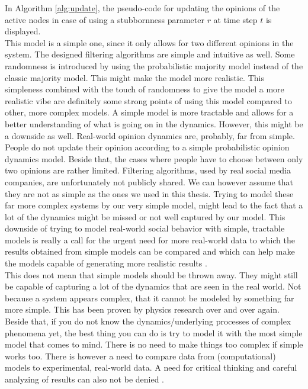 \documentclass[11 pt , letterpaper , twoside , openright]{book}
\begin{document}
\newline
In Algorithm \ref{alg:update}, the pseudo-code for updating the opinions of the active nodes in case of using a stubbornness parameter $r$ at time step $t$ is displayed. \\
\newline
This model is a simple one, since it only allows for two different opinions in the system. The designed filtering algorithms are simple and intuitive as well. Some randomness is introduced by using the probabilistic majority model instead of the classic majority model. This might make the model more realistic. This simpleness combined with the touch of randomness to give the model a more realistic vibe are definitely some strong points of using this model compared to other, more complex models. A simple model is more tractable and allows for a better understanding of what is going on in the dynamics. However, this might be a downside as well. Real-world opinion dynamics are, probably, far from simple. People do not update their opinion according to a simple probabilistic opinion dynamics model. Beside that, the cases where people have to choose between only two opinions are rather limited. Filtering algorithms, used by real social media companies, are unfortunately not publicly shared. We can however assume that they are not as simple as the ones we used in this thesis. Trying to model these far more complex systems by our very simple model, might lead to the fact that a lot of the dynamics might be missed or not well captured by our model. This downside of trying to model real-world social behavior with simple, tractable models is really a call for the urgent need for more real-world data to which the results obtained from simple models can be compared and which can help make the models capable of generating more realistic results \cite{Pawel}. \\
\newline
This does not mean that simple models should be thrown away. They might still be capable of capturing a lot of the dynamics that are seen in the real world. Not because a system appears complex, that it cannot be modeled by something far more simple. This has been proven by physics research over and over again. Beside that, if you do not know the dynamics/underlying processes of complex phenomena yet, the best thing you can do is try to model it with the most simple model that comes to mind. There is no need to make things too complex if simple works too. There is however a need to compare data from (computational) models to experimental, real-world data. A need for critical thinking and careful analyzing of results can also not be denied \cite{Pawel}.
\end{document}
